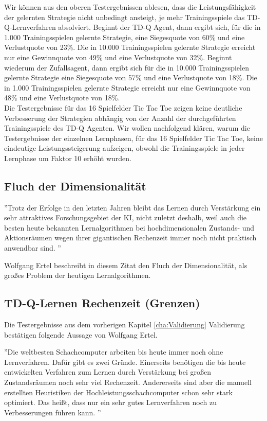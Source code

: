 Wir können aus den oberen Testergebnissen ablesen, dass die Leistungsfähigkeit der gelernten Strategie nicht unbedingt ansteigt, je mehr Trainingsspiele das TD-Q-Lernverfahren absolviert. Beginnt der TD-Q Agent, dann ergibt sich, für die in 1.000 Trainingsspielen gelernte Strategie, eine Siegesquote von 60\% und eine Verlustquote von 23\%. Die in 10.000 Trainingsspielen gelernte Strategie erreicht nur eine Gewinnquote von 49\% und eine Verlustquote von 32\%. Beginnt wiederum der Zufallsagent, dann ergibt sich für die in 10.000 Trainingsspielen gelernte Strategie eine Siegesquote von 57\% und eine Verlustquote von 18\%. Die in 1.000 Trainingsspielen gelernte Strategie erreicht nur eine Gewinnquote von 48\% und eine Verlustquote von 18\%. \\

Die Testergebnisse für das 16 Spielfelder Tic Tac Toe zeigen keine deutliche Verbesserung der Strategien abhängig von der Anzahl der durchgeführten Trainingsspiele des TD-Q Agenten. Wir wollen nachfolgend klären, warum die Testergebnisse der einzelnen Lernphasen, für das 16 Spielfelder Tic Tac Toe, keine eindeutige Leistungssteigerung aufzeigen, obwohl die Trainingsspiele in jeder Lernphase um Faktor 10 erhöht wurden. \\

\subsection{Fluch der Dimensionalität}
''Trotz der Erfolge in den letzten Jahren bleibt das Lernen durch Verstärkung ein sehr attraktives Forschungsgebiet der KI, nicht zuletzt deshalb, weil auch die besten heute bekannten Lernalgorithmen bei hochdimensionalen Zustands- und Aktionsräumen wegen ihrer gigantischen Rechenzeit immer noch nicht praktisch anwendbar sind. \cite[305]{Ertel}''

Wolfgang Ertel beschreibt in diesem Zitat den Fluch der Dimensionalität, als großes Problem der heutigen Lernalgorithmen. 

 
\subsection{TD-Q-Lernen Rechenzeit (Grenzen)}


Die Testergebnisse aus dem vorherigen Kapitel \ref{cha:Validierung} Validierung bestätigen folgende Aussage von Wolfgang Ertel.

''Die weltbesten Schachcomputer arbeiten bis heute immer noch ohne Lernverfahren. Dafür gibt es zwei Gründe. Einerseits benötigen die bis heute entwickelten Verfahren zum Lernen durch Verstärkung bei großen Zustandsräumen noch sehr viel Rechenzeit. Andererseits sind aber die manuell erstellten Heuristiken der Hochleistungsschachcomputer schon sehr stark optimiert. Das heißt, dass nur ein sehr gutes Lernverfahren noch zu Verbesserungen führen kann. \cite[120]{Ertel}''\\

